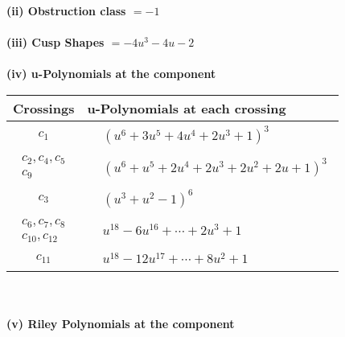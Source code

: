 \documentclass[1p]{elsarticle_modified}
\theoremstyle{definition}
\begin{document}
\flushleft \textbf{(ii) Obstruction class $= -1$}\\~\\
\flushleft \textbf{(iii) Cusp Shapes $= -4 u^3-4 u-2$}\\~\\
\newpage\renewcommand{\arraystretch}{1}
\flushleft \textbf{(iv) u-Polynomials at the component}\newline \\
\begin{tabular}{m{50pt}|m{274pt}}
Crossings & \hspace{64pt}u-Polynomials at each crossing \\
\hline $$\begin{aligned}c_{1}\end{aligned}$$&$\begin{aligned}
&(u^6+3 u^5+4 u^4+2 u^3+1)^3
\end{aligned}$\\
\hline $$\begin{aligned}c_{2},c_{4},c_{5}\\c_{9}\end{aligned}$$&$\begin{aligned}
&(u^6+u^5+2 u^4+2 u^3+2 u^2+2 u+1)^3
\end{aligned}$\\
\hline $$\begin{aligned}c_{3}\end{aligned}$$&$\begin{aligned}
&(u^3+u^2-1)^6
\end{aligned}$\\
\hline $$\begin{aligned}c_{6},c_{7},c_{8}\\c_{10},c_{12}\end{aligned}$$&$\begin{aligned}
&u^{18}-6 u^{16}+\cdots+2 u^3+1
\end{aligned}$\\
\hline $$\begin{aligned}c_{11}\end{aligned}$$&$\begin{aligned}
&u^{18}-12 u^{17}+\cdots+8 u^2+1
\end{aligned}$\\
\hline
\end{tabular}\\~\\
\newpage\renewcommand{\arraystretch}{1}
\flushleft \textbf{(v) Riley Polynomials at the component}\newline \\
\end{document}
